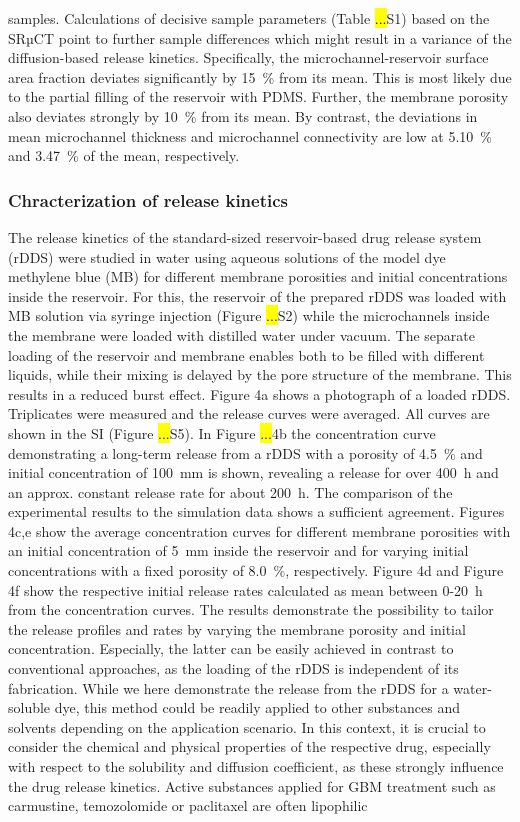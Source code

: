 samples. Calculations of decisive sample parameters (Table \hl{...}S1) based on the SRµCT point to further sample differences which might result in a variance of the diffusion-based release kinetics. Specifically, the microchannel-reservoir surface area fraction deviates significantly by 15~\% from its mean. This is most likely due to the partial filling of the reservoir with PDMS. Further, the membrane porosity also deviates strongly by 10~\% from its mean. By contrast, the deviations in mean microchannel thickness and microchannel connectivity are low at 5.10~\% and 3.47~\% of the mean, respectively. 

\subsubsection{Chracterization of release kinetics}
The release kinetics of the standard-sized reservoir-based drug release system (rDDS) were studied in water using aqueous solutions of the model dye methylene blue (MB) for different membrane porosities and initial concentrations inside the reservoir. For this, the reservoir of the prepared rDDS was loaded with MB solution via syringe injection (Figure \hl{...}S2) while the microchannels inside the membrane were loaded with distilled water under vacuum. The separate loading of the reservoir and membrane enables both to be filled with different liquids, while their mixing is delayed by the pore structure of the membrane. This results in a reduced burst effect. Figure 4a shows a photograph of a loaded rDDS. Triplicates were measured and the release curves were averaged. All curves are shown in the SI (Figure \hl{...}S5). In Figure \hl{...}4b the concentration curve demonstrating a long-term release from a rDDS with a porosity of 4.5~\% and initial concentration of 100~mm is shown, revealing a release for over 400~h and an approx. constant release rate for about 200~h. The comparison of the experimental results to the simulation data shows a sufficient agreement. Figures 4c,e show the average concentration curves for different membrane porosities with an initial concentration of 5~mm inside the reservoir and for varying initial concentrations with a fixed porosity of 8.0~\%, respectively. Figure 4d and Figure 4f show the respective initial release rates calculated as mean between 0-20~h from the concentration curves. The results demonstrate the possibility to tailor the release profiles and rates by varying the membrane porosity and initial concentration. Especially, the latter can be easily achieved in contrast to conventional approaches, as the loading of the rDDS is independent of its fabrication. While we here demonstrate the release from the rDDS for a water-soluble dye, this method could be readily applied to other substances and solvents depending on the application scenario. In this context, it is crucial to consider the chemical and physical properties of the respective drug, especially with respect to the solubility and diffusion coefficient, as these strongly influence the drug release kinetics. Active substances applied for GBM treatment such as carmustine\supercite{lin2008carmustine}, temozolomide\supercite{fisher2021current} or paclitaxel\supercite{zhao2019codelivery} are often lipophilic 